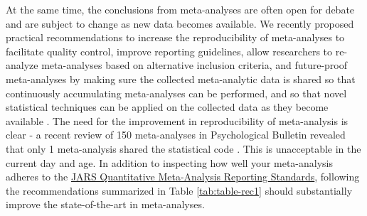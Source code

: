 \documentclass[
  oneside]{krantz}
\begin{document}
At the same time, the conclusions from meta-analyses are often open for debate and are subject to change as new data becomes available. We recently proposed practical recommendations to increase the reproducibility of meta-analyses to facilitate quality control, improve reporting guidelines, allow researchers to re-analyze meta-analyses based on alternative inclusion criteria, and future-proof meta-analyses by making sure the collected meta-analytic data is shared so that continuously accumulating meta-analyses can be performed, and so that novel statistical techniques can be applied on the collected data as they become available \citep{lakens_reproducibility_2016}. The need for the improvement in reproducibility of meta-analysis is clear - a recent review of 150 meta-analyses in Psychological Bulletin revealed that only 1 meta-analysis shared the statistical code \citep{polanin_transparency_2020}. This is unacceptable in the current day and age. In addition to inspecting how well your meta-analysis adheres to the \href{https://apastyle.apa.org/jars/quant-table-9.pdf}{JARS Quantitative Meta-Analysis Reporting Standards}, following the recommendations summarized in Table \ref{tab:table-rec1} should substantially improve the state-of-the-art in meta-analyses.
\end{document}
